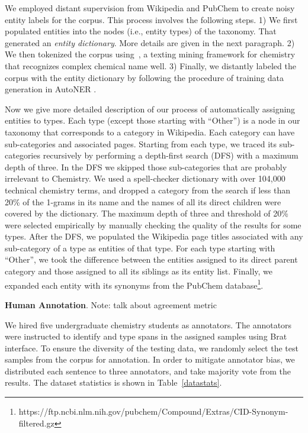
We employed distant supervision from Wikipedia and PubChem to create noisy entity labels for the corpus. This process involves the following steps. 1) We first populated entities into the nodes (i.e., entity types) of the taxonomy. That generated an \textit{entity dictionary}. More details are given in the next paragraph. 2) We then tokenized the corpus using~\cite{oscar4}, a texting mining framework for chemistry that recognizes complex chemical name well. 3) Finally, we distantly labeled the corpus with the entity dictionary by following the procedure of training data generation in AutoNER \cite{DBLP:conf/emnlp/ShangLGRR018}.

Now we give more detailed description of our process of automatically assigning entities to types. Each type (except those starting with ``Other'') is a node in our taxonomy that corresponds to a category in Wikipedia. Each category can have sub-categories and associated pages. Starting from each type, we traced its sub-categories recursively by performing a depth-first search (DFS) with a maximum depth of three. In the DFS we skipped those sub-categories that are probably irrelevant to Chemistry. We used a spell-checker dictionary \cite{azman2012chemistry} with over 104,000 technical chemistry terms, and dropped a category from the search if less than 20\% of the 1-grams in its name and the names of all its direct children were covered by the dictionary. The maximum depth of three and threshold of 20\% were selected empirically by manually checking the quality of the results for some types. After the DFS, we populated the Wikipedia page titles associated with any sub-category of a type as entities of that type. For each type starting with ``Other'', we took the difference between the entities assigned to its direct parent category and those assigned to all its siblings as its entity list. Finally, we expanded each entity with its synonyms from the PubChem database\footnote{https://ftp.ncbi.nlm.nih.gov/pubchem/Compound/Extras/CID-Synonym-filtered.gz}.

\noindent \textbf{Human Annotation}.
Note: talk about agreement metric


We hired five undergraduate chemistry students as annotators. The annotators were instructed to identify and type spans in the assigned samples using Brat~\cite{brat} interface. To ensure the diversity of the testing data, we randomly select the test samples from the corpus for annotation. In order to mitigate annotator bias, we distributed each sentence to three annotators, and take majority vote from the results. The dataset statistics is shown in Table~\ref{datastats}.



%
